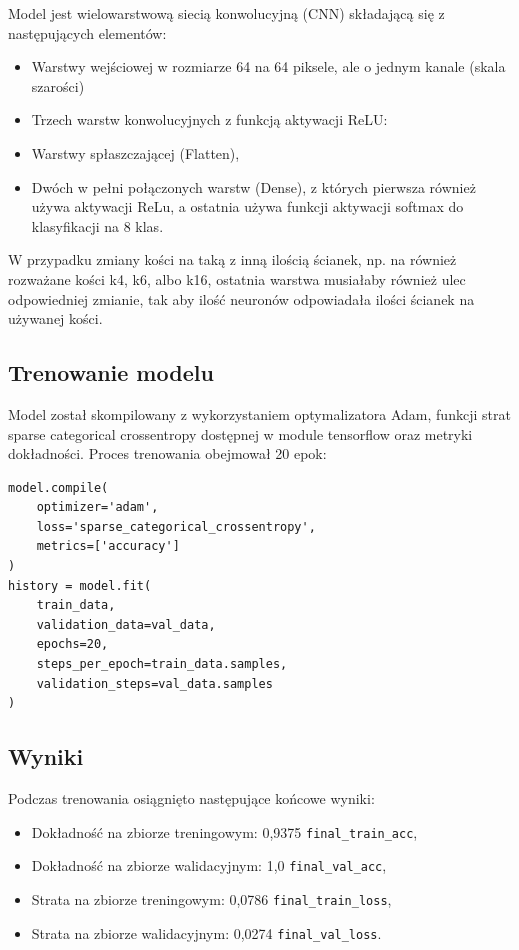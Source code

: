 Model jest wielowarstwową siecią konwolucyjną (CNN) składającą się z następujących elementów:

\begin{itemize}
    \item Warstwy wejściowej w rozmiarze 64 na 64 piksele, ale o jednym kanale (skala szarości)
    \item Trzech warstw konwolucyjnych z funkcją aktywacji ReLU:
    \item Warstwy spłaszczającej (Flatten),
    \item Dwóch w pełni połączonych warstw (Dense), z których pierwsza również używa aktywacji ReLu,
a ostatnia używa funkcji aktywacji softmax do klasyfikacji na 8 klas.
\end{itemize}

W przypadku zmiany kości na taką z inną ilością ścianek, np. na również rozważane kości k4, k6, albo k16,
ostatnia warstwa musiałaby również ulec odpowiedniej zmianie, tak aby ilość neuronów odpowiadała ilości ścianek na używanej kości.

\subsection{Trenowanie modelu}\label{subsec:trenowanie-modelu}

Model został skompilowany z wykorzystaniem optymalizatora Adam,
funkcji strat sparse categorical crossentropy dostępnej w module tensorflow oraz metryki dokładności.
Proces trenowania obejmował 20 epok:

\begin{verbatim}
model.compile(
    optimizer='adam',
    loss='sparse_categorical_crossentropy',
    metrics=['accuracy']
)
history = model.fit(
    train_data,
    validation_data=val_data,
    epochs=20,
    steps_per_epoch=train_data.samples,
    validation_steps=val_data.samples
)
\end{verbatim}

\subsection{Wyniki}\label{subsec:wyniki}

Podczas trenowania osiągnięto następujące końcowe wyniki:

\begin{itemize}
    \item Dokładność na zbiorze treningowym: 0,9375 \texttt{final\_train\_acc},
    \item Dokładność na zbiorze walidacyjnym: 1,0  \texttt{final\_val\_acc},
    \item Strata na zbiorze treningowym: 0,0786  \texttt{final\_train\_loss},
    \item Strata na zbiorze walidacyjnym: 0,0274  \texttt{final\_val\_loss}.
\end{itemize}

